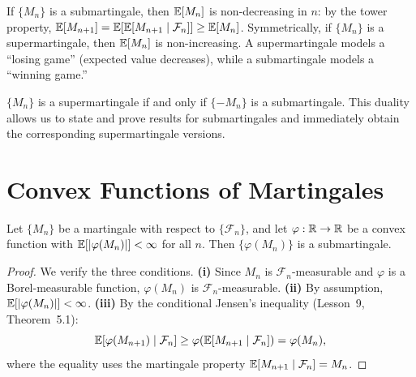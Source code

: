\documentclass[11pt,a4paper]{article}
\begin{document}
\begin{remark}
\label{rem:monotonicity}
If $\{M_n\}$ is a submartingale, then $\mathbb{E}[M_n]$ is
non-decreasing in $n$: by the tower property,
$\mathbb{E}[M_{n+1}] = \mathbb{E}[\mathbb{E}[M_{n+1} \mid \mathcal{F}_n]] \geq
\mathbb{E}[M_n]$.  Symmetrically, if $\{M_n\}$ is a supermartingale,
then $\mathbb{E}[M_n]$ is non-increasing.  A supermartingale models a
``losing game'' (expected value decreases), while a submartingale
models a ``winning game.''
\end{remark}

\begin{remark}[Duality]
\label{rem:duality}
$\{M_n\}$ is a supermartingale if and only if $\{-M_n\}$ is a
submartingale.  This duality allows us to state and prove results
for submartingales and immediately obtain the corresponding
supermartingale versions.
\end{remark}


\section{Convex Functions of Martingales}
\label{sec:convex_martingale}

\begin{keyresult}[title={Convex Functions of Martingales}]
\begin{proposition}
\label{prop:convex_martingale}
Let $\{M_n\}$ be a martingale with respect to
$\{\mathcal{F}_n\}$, and let $\varphi : \mathbb{R} \to \mathbb{R}$ be a convex
function with $\mathbb{E}[|\varphi(M_n)|] < \infty$ for all $n$.  Then
$\{\varphi(M_n)\}$ is a submartingale.
\end{proposition}
\end{keyresult}

\begin{proof}
We verify the three conditions.  \textbf{(i)} Since $M_n$ is
$\mathcal{F}_n$-measurable and $\varphi$ is a Borel-measurable
function, $\varphi(M_n)$ is $\mathcal{F}_n$-measurable.
\textbf{(ii)} By assumption, $\mathbb{E}[|\varphi(M_n)|] < \infty$.
\textbf{(iii)} By the conditional Jensen's inequality (Lesson~9,
Theorem~5.1):
\begin{equation}
  \mathbb{E}[\varphi(M_{n+1}) \mid \mathcal{F}_n]
  \geq \varphi\!\left(\mathbb{E}[M_{n+1} \mid \mathcal{F}_n]\right)
  = \varphi(M_n),
  \label{eq:convex_sub}
\end{equation}
where the equality uses the martingale property
$\mathbb{E}[M_{n+1} \mid \mathcal{F}_n] = M_n$.
\end{proof}
\end{document}

